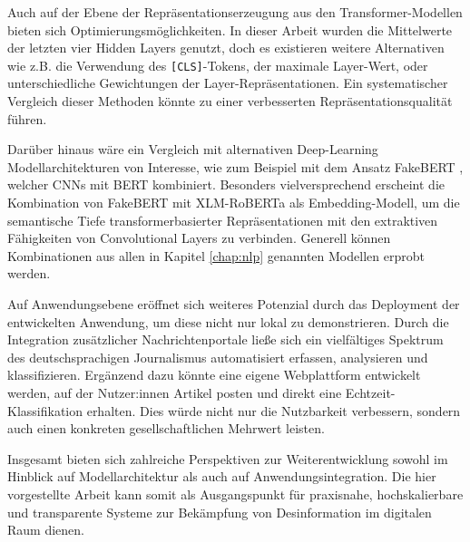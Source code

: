 Auch auf der Ebene der Repräsentationserzeugung aus den Transformer-Modellen bieten sich Optimierungsmöglichkeiten. 
In dieser Arbeit wurden die Mittelwerte der letzten vier Hidden Layers genutzt, doch es existieren weitere Alternativen wie z.B. die Verwendung des 
\texttt{[CLS]}-Tokens, der maximale Layer-Wert, oder unterschiedliche Gewichtungen der Layer-Repräsentationen. 
Ein systematischer Vergleich dieser Methoden könnte zu einer verbesserten Repräsentationsqualität führen.

Darüber hinaus wäre ein Vergleich mit alternativen Deep-Learning Modellarchitekturen von Interesse, wie zum Beispiel mit dem Ansatz FakeBERT \cite{Kaliyar:2021aa}, 
welcher CNNs mit BERT kombiniert. Besonders vielversprechend erscheint die Kombination von FakeBERT mit XLM-RoBERTa als Embedding-Modell,
um die semantische Tiefe transformerbasierter Repräsentationen mit den extraktiven Fähigkeiten von Convolutional Layers zu verbinden.
Generell können Kombinationen aus allen in Kapitel \ref{chap:nlp} genannten Modellen erprobt werden.

Auf Anwendungsebene eröffnet sich weiteres Potenzial durch das Deployment der entwickelten Anwendung, um diese nicht nur lokal zu demonstrieren.
Durch die Integration zusätzlicher Nachrichtenportale ließe sich ein vielfältiges Spektrum des deutschsprachigen Journalismus automatisiert erfassen, 
analysieren und klassifizieren.
Ergänzend dazu könnte eine eigene Webplattform entwickelt werden, auf der Nutzer:innen Artikel posten und direkt eine Echtzeit-Klassifikation 
erhalten. Dies würde nicht nur die Nutzbarkeit verbessern, sondern auch einen konkreten gesellschaftlichen Mehrwert leisten.

Insgesamt bieten sich zahlreiche Perspektiven zur Weiterentwicklung sowohl im Hinblick auf Modellarchitektur als auch auf Anwendungsintegration. 
Die hier vorgestellte Arbeit kann somit als Ausgangspunkt für praxisnahe, hochskalierbare und transparente Systeme zur Bekämpfung von Desinformation 
im digitalen Raum dienen.

